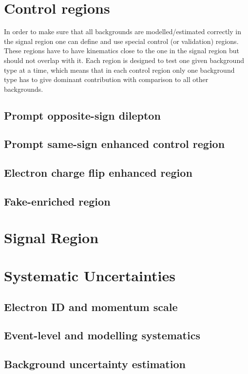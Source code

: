 \section{Control regions}

In order to make sure that all backgrounds are modelled/estimated correctly in the signal region one can define and use special control (or validation) regions.
These regions have to have kinematics close to the one in the signal region but should not overlap with it. Each region is designed to test one given background type at a time,
which means that in each control region only one background type has to give dominant contribution with comparison to all other backgrounds.


\subsection{Prompt opposite-sign dilepton}
\subsection{Prompt same-sign enhanced control region}
\subsection{Electron charge flip enhanced region}
\subsection{Fake-enriched region}

\section{Signal Region}
\label{sec:wprimeSignalRegion}

\section{Systematic Uncertainties}
\label{sec:wprimeSystematics}
\subsection{Electron ID and momentum scale}
\subsection{Event-level and modelling systematics}
\subsection{Background uncertainty estimation}
